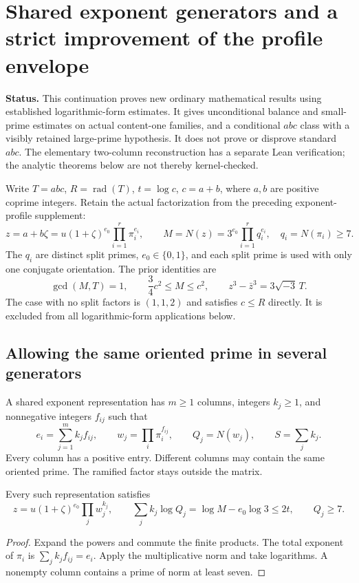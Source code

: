 \section{Shared exponent generators and a strict improvement of the profile envelope}
\label{sec:sg-start}
\noindent\textbf{Status.} This continuation proves new ordinary mathematical
results using established logarithmic-form estimates. It gives unconditional
balance and small-prime estimates on actual content-one families, and a
conditional $abc$ class with a visibly retained large-prime hypothesis. It does
not prove or disprove standard $abc$. The elementary two-column reconstruction
has a separate Lean verification; the analytic theorems below are not thereby
kernel-checked.

Write $T=abc$, $R=\operatorname{rad}(T)$, $t=\log c$, $c=a+b$, where $a,b$ are
positive coprime integers. Retain the actual factorization from the preceding
exponent-profile supplement:
\[
 z=a+b\zeta=u(1+\zeta)^{e_0}\prod_{i=1}^r\pi_i^{e_i},\qquad
 M=N(z)=3^{e_0}\prod_{i=1}^r q_i^{e_i},
 \quad q_i=N(\pi_i)\ge7.
\]
The $q_i$ are distinct split primes, $e_0\in\{0,1\}$, and each split prime is
used with only one conjugate orientation. The prior identities are
\begin{equation}\label{eq:sg-baseline}
 \gcd(M,T)=1,\qquad \frac34c^2\le M\le c^2,\qquad
 z^3-\bar z^3=3\sqrt{-3}\,T.
\end{equation}
The case with no split factors is $(1,1,2)$ and satisfies $c\le R$ directly.
It is excluded from all logarithmic-form applications below.

\subsection{Allowing the same oriented prime in several generators}
\begin{definition}\label{def:sg-matrix}
A shared exponent representation has $m\ge1$ columns, integers $k_j\ge1$,
and nonnegative integers $f_{ij}$ such that
\[
 e_i=\sum_{j=1}^m k_j f_{ij},\qquad
 w_j=\prod_i\pi_i^{f_{ij}},\qquad Q_j=N(w_j),\qquad S=\sum_jk_j.
\]
Every column has a positive entry. Different columns may contain the same
oriented prime. The ramified factor stays outside the matrix.
\end{definition}

\begin{lemma}\label{lem:sg-reconstruction}
Every such representation satisfies
\[
 z=u(1+\zeta)^{e_0}\prod_jw_j^{k_j},\qquad
 \sum_j k_j\log Q_j=\log M-e_0\log3\le2t,\qquad Q_j\ge7.
\]
\end{lemma}
\begin{proof}
Expand the powers and commute the finite products. The total exponent of
$\pi_i$ is $\sum_j k_jf_{ij}=e_i$. Apply the multiplicative norm and take
logarithms. A nonempty column contains a prime of norm at least seven.
\end{proof}

